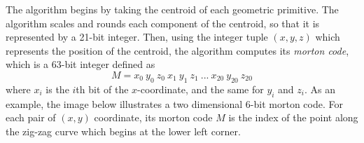 The algorithm begins by taking the centroid of each geometric primitive. The algorithm scales and rounds each component of the centroid, so that it is represented by a 21-bit integer. Then, using the integer tuple $(x,y,z)$ which represents the position of the centroid, the algorithm computes its \textit{morton code}, which is a 63-bit integer defined as
$$ M=x_0~y_0~z_0~x_1~y_1~z_1~...~x_{20}~y_{20}~z_{20} $$
where $x_i$ is the $i$th bit of the $x$-coordinate, and the same for $y_i$ and $z_i$. As an example, the image below illustrates a two dimensional 6-bit morton code. For each pair of $(x,y)$ coordinate, its morton code $M$ is the index of the point along the zig-zag curve which begins at the lower left corner.
\begin{figure}[H]
    \centering
    



\begin{tikzpicture}[x=0.75pt,y=0.75pt,yscale=-1,xscale=1]


\end{tikzpicture}
\end{figure}
